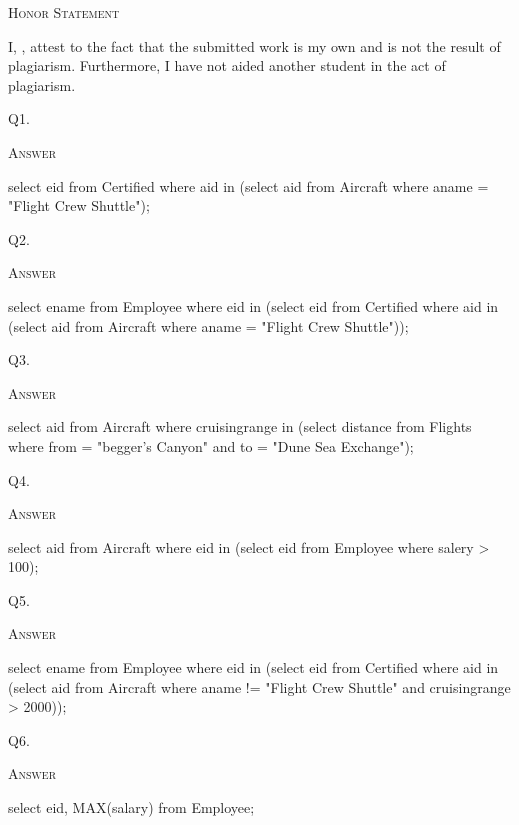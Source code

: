 



\begin{center}
  \textsc{Honor Statement}
\end{center}
I, ,
attest to the fact that the submitted work is my own and
is not the result of plagiarism.
Furthermore, I have not aided another student in the act of
plagiarism.



\newpage
Q1. 

\textsc{Answer}
\begin{answercode}
  select eid from Certified where aid in 
  (select aid from Aircraft where aname = "Flight Crew Shuttle");
\end{answercode}

Q2. 

\textsc{Answer}
\begin{answercode}
  select ename from Employee where eid in
  (select eid from Certified where aid in 
  (select aid from Aircraft where aname = "Flight Crew Shuttle"));
\end{answercode}

Q3. 

\textsc{Answer}
\begin{answercode}
  select aid from Aircraft where cruisingrange in
  (select distance from Flights where 
    from = "begger's Canyon" and to = "Dune Sea Exchange");
\end{answercode}


\newpage
Q4. 

\textsc{Answer}
\begin{answercode}
select aid from Aircraft where eid in 
(select eid from Employee where salery > 100);
\end{answercode}


\newpage

Q5. 

\textsc{Answer}
\begin{answercode}
select ename from Employee where eid in
(select eid from Certified where aid in 
(select aid from Aircraft where 
  aname != "Flight Crew Shuttle" and cruisingrange > 2000));
\end{answercode}


Q6. 

\textsc{Answer}
\begin{answercode}
select eid, MAX(salary) from Employee;
\end{answercode}

